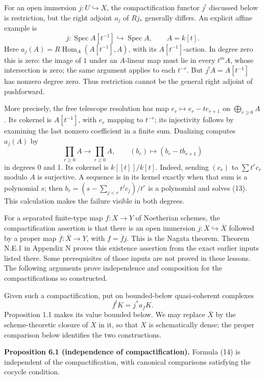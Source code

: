 \documentclass[11pt]{article}
\begin{document}
For an open immersion \(j:U\hookrightarrow X\), the compactification
functor \(j^!\) discussed below is restriction, but the right adjoint
\(a_j\) of \(Rj_*\) generally differs. An explicit affine example is \[
j:\operatorname{Spec}A[t^{-1}]\hookrightarrow\operatorname{Spec}A,
\qquad A=k[t].
\] Here \(a_j(A)=R\operatorname{Hom}_A(A[t^{-1}],A)\), with its
\(A[t^{-1}]\)-action. In degree zero this is zero: the image of \(1\)
under an \(A\)-linear map must lie in every \(t^mA\), whose intersection
is zero; the same argument applies to each \(t^{-r}\). But
\(j^!A=A[t^{-1}]\) has nonzero degree zero. Thus restriction cannot be
the general right adjoint of pushforward.

More precisely, the free telescope resolution has map
\(e_r\mapsto e_r-te_{r+1}\) on \(\bigoplus_{r\geq0}A\). Its cokernel is
\(A[t^{-1}]\), with \(e_r\) mapping to \(t^{-r}\); its injectivity
follows by examining the last nonzero coefficient in a finite sum.
Dualizing computes \(a_j(A)\) by \[
\prod_{r\geq0}A\longrightarrow\prod_{r\geq0}A,
\qquad (b_r)\longmapsto(b_r-tb_{r+1})
\tag{13}
\] in degrees 0 and 1. Its cokernel is \(k[[t]]/k[t]\). Indeed, sending
\((c_r)\) to \(\sum t^rc_r\) modulo \(A\) is surjective. A sequence is
in its kernel exactly when that sum is a polynomial \(s\); then
\(b_r=(s-\sum_{j<r}t^jc_j)/t^r\) is a polynomial and solves (13). This
calculation makes the failure visible in both degrees.

For a separated finite-type map \(f:X\to Y\) of Noetherian schemes, the
compactification assertion is that there is an open immersion
\(j:X\hookrightarrow\overline X\) followed by a proper map
\(\overline f:\overline X\to Y\), with \(f=\overline f j\). This is the
Nagata theorem. Theorem N.E.1 in Appendix N proves this existence
assertion from the exact earlier inputs listed there. Some prerequisites
of those inputs are not proved in these lessons. The following arguments
prove independence and composition for the compactifications so
constructed.

Given such a compactification, put on bounded-below quasi-coherent
complexes \[
f^!K=j^*a_{\overline f}K.
\tag{14}
\] Proposition 1.1 makes its value bounded below. We may replace
\(\overline X\) by the scheme-theoretic closure of \(X\) in it, so that
\(X\) is schematically dense; the proper comparison below identifies the
two constructions.

\textbf{Proposition 6.1 (independence of compactification).} Formula
(14) is independent of the compactification, with canonical comparisons
satisfying the cocycle condition.
\end{document}
